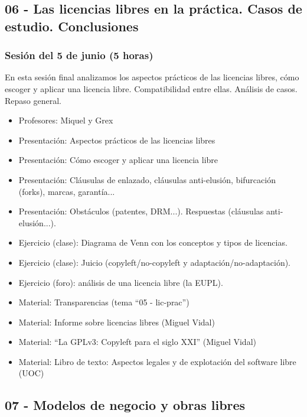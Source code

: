 \documentclass[a4paper,12pt]{article}
\begin{document}
\subsection{06 - Las licencias libres en la práctica. Casos de estudio. Conclusiones}

\subsubsection{Sesión del 5 de junio (5 horas)}

En esta sesión final analizamos los aspectos prácticos de las licencias libres, cómo escoger y aplicar una licencia libre. Compatibilidad entre ellas. Análisis de casos. Repaso general.

 \begin{itemize}
 \item Profesores: Miquel y Grex
 \item Presentación: Aspectos prácticos de las licencias libres
 \item Presentación: Cómo escoger y aplicar una licencia libre
 \item Presentación: Cláusulas de enlazado, cláusulas anti-elusión, bifurcación (forks), marcas, garantía...
 \item Presentación: Obstáculos (patentes, DRM...). Respuestas (cláusulas anti-elusión...). 
 \item Ejercicio (clase): Diagrama de Venn con los conceptos y tipos de licencias.  \\
 \item Ejercicio (clase): Juicio (copyleft/no-copyleft y adaptación/no-adaptación).  \\
 \item Ejercicio (foro): análisis de una licencia libre (la EUPL).  \\
 \item Material: Transparencias (tema ``05 - lic-prac'')
 \item Material: Informe sobre licencias libres (Miguel Vidal)
 \item Material: ``La GPLv3: Copyleft para el siglo XXI'' (Miguel Vidal)
 \item Material: Libro de texto: Aspectos legales y de explotación del software libre (UOC)
 \end{itemize}

\subsection{07 - Modelos de negocio y obras libres}
\end{document}

